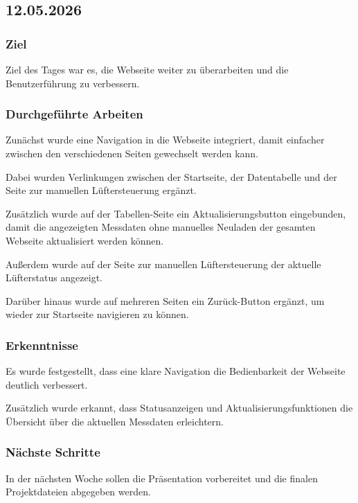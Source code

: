 \subsection{12.05.2026}

\subsubsection{Ziel}

Ziel des Tages war es, die Webseite weiter
zu überarbeiten und die Benutzerführung zu
verbessern.

\subsubsection{Durchgeführte Arbeiten}

Zunächst wurde eine Navigation in die Webseite
integriert, damit einfacher zwischen den
verschiedenen Seiten gewechselt werden kann.

Dabei wurden Verlinkungen zwischen der
Startseite, der Datentabelle und der Seite
zur manuellen Lüftersteuerung ergänzt.

Zusätzlich wurde auf der Tabellen-Seite ein
Aktualisierungsbutton eingebunden, damit die
angezeigten Messdaten ohne manuelles Neuladen
der gesamten Webseite aktualisiert werden können.

Außerdem wurde auf der Seite zur manuellen
Lüftersteuerung der aktuelle Lüfterstatus
angezeigt.

Darüber hinaus wurde auf mehreren Seiten ein
Zurück-Button ergänzt, um wieder zur
Startseite navigieren zu können.

\subsubsection{Erkenntnisse}

Es wurde festgestellt, dass eine klare
Navigation die Bedienbarkeit der Webseite
deutlich verbessert.

Zusätzlich wurde erkannt, dass Statusanzeigen
und Aktualisierungsfunktionen die Übersicht
über die aktuellen Messdaten erleichtern.

\subsubsection{Nächste Schritte}

In der nächsten Woche sollen die Präsentation
vorbereitet und die finalen Projektdateien
abgegeben werden.